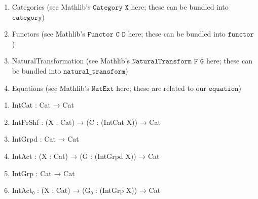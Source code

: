 \documentclass{book}
\theoremstyle{definition}
\begin{document}
\newpage

\begin{enumerate}
\item Categories (see Mathlib's $\texttt{Category X}$ here; these can be bundled into $\texttt{category}$)
\item Functors (see Mathlib's $\texttt{Functor C D}$ here; these can be bundled into $\texttt{functor}$)
\item NaturalTransformation (see Mathlib's $\texttt{NaturalTransform F G}$ here; these can be bundled into $\texttt{natural\_transform}$)
\item Equations (see Mathlib's $\texttt{NatExt}$ here; these are related to our $\texttt{equation}$)
\end{enumerate}

\begin{enumerate}
\item IntCat : Cat → Cat 
\item IntPrShf : (X : Cat) → (C : (IntCat X)) → Cat
\item IntGrpd : Cat → Cat
\item IntAct : (X : Cat) → (G : (IntGrpd X)) → Cat
\item IntGrp : Cat → Cat
\item IntAct₀ : (X : Cat) → (G₀ : (IntGrp X)) → Cat
\end{enumerate} 
\end{document}

